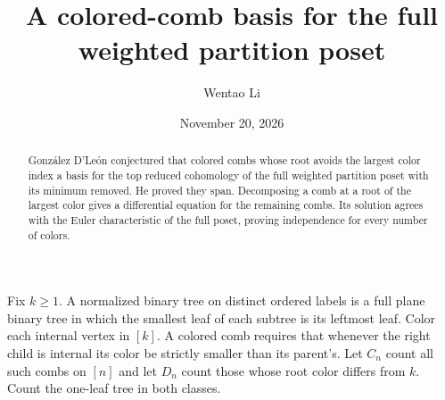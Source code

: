 \documentclass[11pt]{article}
\title{A colored-comb basis for the full weighted partition poset}
\author{Wentao Li}
\date{November 20, 2026}
\begin{document}
\maketitle
\begin{abstract}
Gonz\'alez D'Le\'on conjectured that colored combs whose root avoids the largest
color index a basis for the top reduced cohomology of the full weighted
partition poset with its minimum removed. He proved they span. Decomposing
a comb at a root of the largest color gives a differential equation for the
remaining combs. Its solution agrees with the Euler characteristic of the
full poset, proving independence for every number of colors.
\end{abstract}

Fix $k\ge1$. A normalized binary tree on distinct ordered labels is a full
plane binary tree in which the smallest leaf of each subtree is its leftmost
leaf. Color each internal vertex in $[k]$. A colored comb requires that
whenever the right child is internal its color be strictly smaller than its
parent's. Let $C_n$ count all such combs on $[n]$ and let $D_n$ count those
whose root color differs from $k$. Count the one-leaf tree in both classes.
\end{document}
